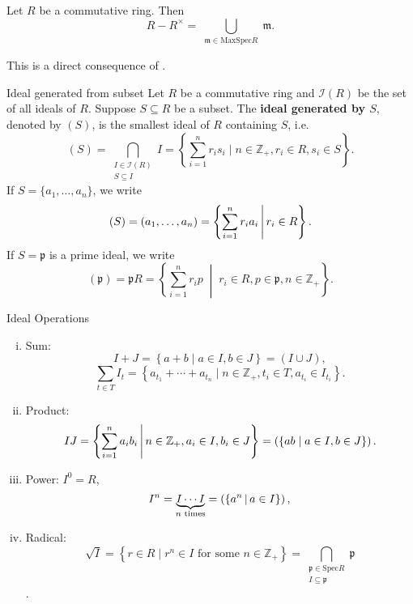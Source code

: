 \begin{corollary}{}{}
    Let $R$ be a commutative ring. Then 
    \[
    R-R^\times=\bigcup_{\substack{\mathfrak{m}\in \mathrm{MaxSpec} R}}\mathfrak{m}.
    \]
\end{corollary}
\begin{prf}
    This is a direct consequence of .
\end{prf}

\begin{definition}{Ideal generated from subset}{}
    Let $R$ be a commutative ring and $\mathcal I(R)$ be the set of all ideals of $R$. Suppose $S\subseteq R$ be a subset. The \textbf{ideal generated by $S$}, denoted by $(S)$, is the smallest ideal of $R$ containing $S$, i.e. 
    \[
        (S)=\bigcap_{\substack{ I\in \mathcal I(R)\\S\subseteq I}}I=\left\{\sum_{i=1}^n r_is_i\mid n\in\mathbb{Z}_{+},r_i\in R,s_i\in S\right\}.
    \]
    If $S=\{a_1,\dots,a_n\}$, we write 
    \[
        (S)=(a_1,\dots,a_n)=\left\{\sum_{i=1}^n r_ia_i\,\middle\vert\,  r_i\in R\right\}.
    \]
    If $S=\mathfrak{p}$ is a prime ideal, we write 
    \[
    (\mathfrak{p})=\mathfrak{p}R = \left\{ \sum_{i=1}^n r_i p \;\middle|\; r_i \in R, p \in \mathfrak{p}, n \in \mathbb{Z}_{+} \right\}.
    \]
\end{definition}

\begin{definition}{Ideal Operations}{}
    \begin{enumerate}[(i)]
        \item Sum: $$I+J=\left\{a+b\mid a\in I,b\in J\right\}=\left(I\cup J\right),$$
        $$
        \sum_{t \in T} I_t=\left\{a_{t_1}+ \cdots +a_{t_n}\mid n\in\mathbb{Z}_{+},t_i\in T,a_{t_i}\in I_{t_i}\right\}.
        $$
        \item Product: $$IJ=\left\{\sum_{i=1}^n a_ib_i\,\middle\vert\, n\in\mathbb{Z}_{+},a_i\in I,b_i\in J\right\}=\left(\{ab\mid a\in I,b\in J\}\right).$$
        \item Power: $I^0=R$,
        \[
            I^n=\underbrace{I\cdots I}_{n\text{ times}}=\left(\{a^n\,\middle\vert\, a\in I\}\right), 
            \]
        \item Radical: \[
            \sqrt{I} = \left\{ r \in R \mid r^n \in I \text{ for some } n \in \mathbb{Z}_{+} \right\} = \bigcap_{\substack{\mathfrak{p} \in \mathrm{Spec} R \\ I \subseteq \mathfrak{p}}} \mathfrak{p}
            \].
    \end{enumerate}
\end{definition}

